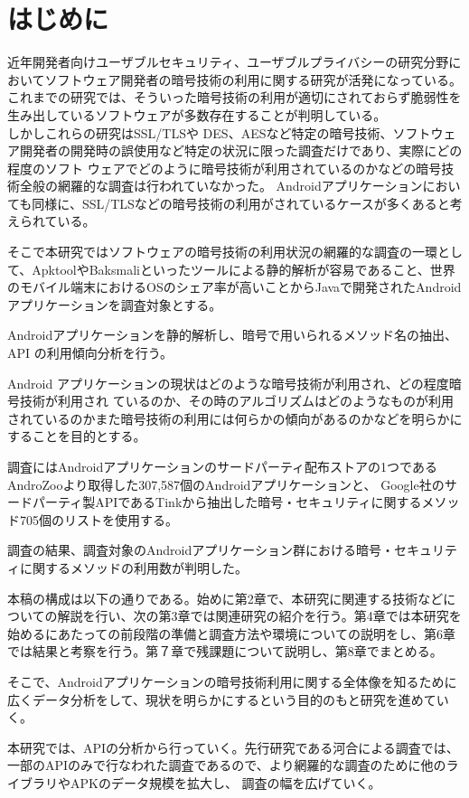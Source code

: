 \newpage
\section{はじめに} 
近年開発者向けユーザブルセキュリティ、ユーザブルプライバシーの研究分野においてソフトウェア開発者の暗号技術の利用に関する研究が活発になっている。
これまでの研究では、そういった暗号技術の利用が適切にされておらず脆弱性を生み出しているソフトウェアが多数存在することが判明している。
\\しかしこれらの研究はSSL/TLSや DES、AESなど特定の暗号技術、ソフトウェア開発者の開発時の誤使用など特定の状況に限った調査だけであり、実際にどの程度のソフト
ウェアでどのように暗号技術が利用されているのかなどの暗号技術全般の網羅的な調査は行われていなかった。
Androidアプリケーションにおいても同様に、SSL/TLSなどの暗号技術の利用がされているケースが多くあると考えられている。

そこで本研究ではソフトウェアの暗号技術の利用状況の網羅的な調査の一環として、ApktoolやBaksmaliといったツールによる静的解析が容易であること、世界のモバイル端末におけるOSのシェア率が高いこと\cite{share}からJavaで開発されたAndroidアプリケーションを調査対象とする。


Androidアプリケーションを静的解析し、暗号で用いられるメソッド名の抽出、API の利用傾向分析を行う。

Android アプリケーションの現状はどのような暗号技術が利用され、どの程度暗号技術が利用され
ているのか、その時のアルゴリズムはどのようなものが利用されているのかまた暗号技術の利用には何らかの傾向があるのかなどを明らかにすることを目的とする。


調査にはAndroidアプリケーションのサードパーティ配布ストアの1つであるAndroZooより取得した307,587個のAndroidアプリケーションと、
Google社のサードパーティ製APIであるTinkから抽出した暗号・セキュリティに関するメソッド705個のリストを使用する。



調査の結果、調査対象のAndroidアプリケーション群における暗号・セキュリティに関するメソッドの利用数が判明した。


本稿の構成は以下の通りである。始めに第2章で、本研究に関連する技術などについての解説を行い、次の第3章では関連研究の紹介を行う。第4章では本研究を始めるにあたっての前段階の準備と調査方法や環境についての説明をし、第6章では結果と考察を行う。第７章で残課題について説明し、第8章でまとめる。



そこで、Androidアプリケーションの暗号技術利用に関する全体像を知るために広くデータ分析をして、現状を明らかにするという目的のもと研究を進めていく。


本研究では、APIの分析から行っていく。先行研究である河合による調査では、一部のAPIのみで行なわれた調査であるので、より網羅的な調査のために他のライブラリやAPKのデータ規模を拡大し、
調査の幅を広げていく。
\fi